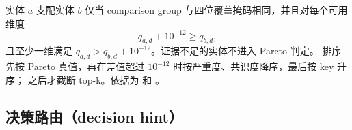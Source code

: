 实体 $a$ 支配实体 $b$ 仅当 comparison group 与四位覆盖掩码相同，并且对每个可用维度
\begin{equation}
 q_{a,d}+10^{-12}\ge q_{b,d},
\end{equation}
且至少一维满足 $q_{a,d}>q_{b,d}+10^{-12}$。证据不足的实体不进入 Pareto 判定。
排序先按 Pareto 真值，再在差值超过 $10^{-12}$ 时按严重度、共识度降序，最后按 key 升序；
之后才截断 top-k。依据为  和
。

\subsection{决策路由（decision hint）}

